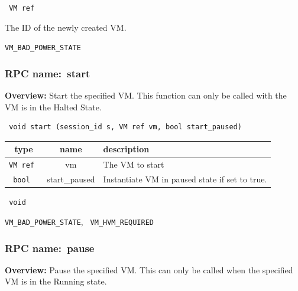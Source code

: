 \vspace{0.3cm}

{\tt 
VM ref
}


The ID of the newly created VM.
\vspace{0.3cm}

 {\tt VM\_BAD\_POWER\_STATE}

\vspace{0.6cm}
\subsubsection{RPC name:~start}

{\bf Overview:} 
Start the specified VM.  This function can only be called with the VM is in
the Halted State.

\begin{verbatim} void start (session_id s, VM ref vm, bool start_paused)\end{verbatim}



 
\vspace{0.3cm}
\begin{tabular}{|c|c|p{7cm}|}
 \hline
{\bf type} & {\bf name} & {\bf description} \\ \hline
{\tt VM ref } & vm & The VM to start \\ \hline 

{\tt bool } & start\_paused & Instantiate VM in paused state if set to true. \\ \hline 

\end{tabular}

\vspace{0.3cm}

{\tt 
void
}



\vspace{0.3cm}

 {\tt VM\_BAD\_POWER\_STATE}, {\tt
VM\_HVM\_REQUIRED}

\vspace{0.6cm}
\subsubsection{RPC name:~pause}

{\bf Overview:} 
Pause the specified VM. This can only be called when the specified VM is in
the Running state.

